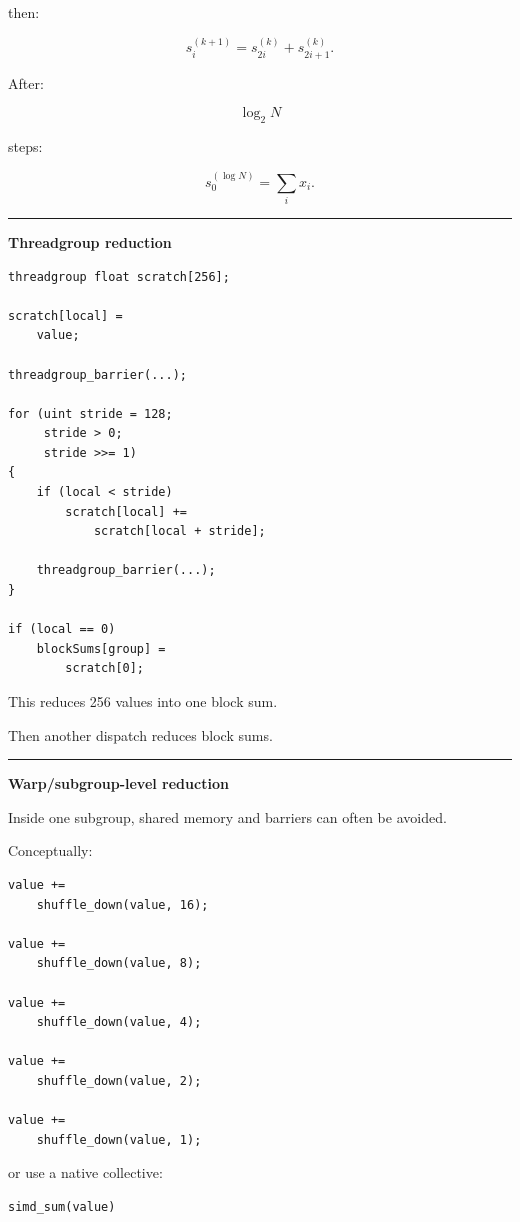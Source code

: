 then:

\[
s^{(k+1)}_i
=
s^{(k)}_{2i}
+
s^{(k)}_{2i+1}.
\]

After:

\[
\log_2N
\]

steps:

\[
s^{(\log N)}_0
=
\sum_i x_i.
\]

\begin{center}\rule{0.5\linewidth}{0.5pt}\end{center}

\textbf{Threadgroup reduction}

\protect{}\label{zq2h7f}%
\begin{verbatim}
threadgroup float scratch[256];

scratch[local] =
    value;

threadgroup_barrier(...);

for (uint stride = 128;
     stride > 0;
     stride >>= 1)
{
    if (local < stride)
        scratch[local] +=
            scratch[local + stride];

    threadgroup_barrier(...);
}

if (local == 0)
    blockSums[group] =
        scratch[0];
\end{verbatim}

This reduces 256 values into one block sum.

Then another dispatch reduces block sums.

\begin{center}\rule{0.5\linewidth}{0.5pt}\end{center}

\textbf{Warp/subgroup-level reduction}

Inside one subgroup, shared memory and barriers can often be avoided.

Conceptually:

\protect{}\label{ywrrrk}%
\begin{verbatim}
value +=
    shuffle_down(value, 16);

value +=
    shuffle_down(value, 8);

value +=
    shuffle_down(value, 4);

value +=
    shuffle_down(value, 2);

value +=
    shuffle_down(value, 1);
\end{verbatim}

or use a native collective:

\protect{}\label{jheza8}%
\begin{verbatim}
simd_sum(value)
\end{verbatim}

